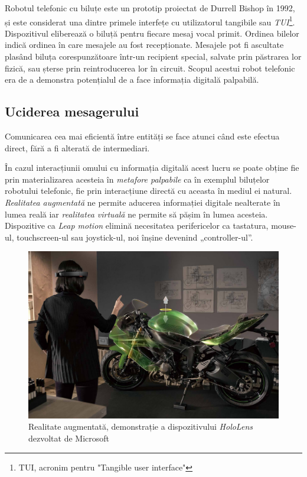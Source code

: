 Robotul telefonic cu biluțe este un prototip proiectat de Durrell Bishop în 1992, și este considerat una dintre primele interfețe cu utilizatorul tangibile sau \textit{TUI}\footnote{TUI, acronim pentru "Tangible user interface"}.
Dispozitivul eliberează o biluță pentru fiecare mesaj vocal primit. Ordinea bilelor indică ordinea în care mesajele au fost recepționate. Mesajele pot fi ascultate plasând biluța corespunzătoare într-un recipient special, salvate prin păstrarea lor fizică, sau șterse prin reintroducerea lor în circuit. Scopul acestui robot telefonic era de a demonstra potențialul de a face informația digitală palpabilă.

\subsection{Uciderea mesagerului}

Comunicarea cea mai eficientă între entități se face atunci când este efectua direct, fără a fi alterată de intermediari.

În cazul interacțiunii omului cu informația digitală acest lucru se poate obține fie prin materializarea acesteia în \textit{metafore palpabile} ca în exemplul biluțelor robotului telefonic, fie prin interacțiune directă cu aceasta în mediul ei natural.
\textit{Realitatea augmentată} ne permite aducerea informației digitale nealterate în lumea reală iar \textit{realitatea virtuală} ne permite să pășim în lumea acesteia.
Dispozitive ca \textit{Leap motion} elimină necesitatea perifericelor ca tastatura, mouse-ul, touchscreen-ul sau joystick-ul, noi înșine devenind „controller-ul”.

\begin{figure}[h]
  \centering
  \includegraphics[scale=0.25]{img/microsoft_hololens_demo.jpg}
  \caption{Realitate augmentată, demonstrație a dispozitivului \textit{HoloLens} dezvoltat de Microsoft}
\end{figure}
